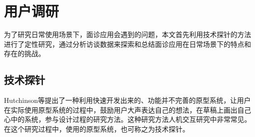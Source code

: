 \chapter{用户调研}

为了研究日常使用场景下，面诊应用会遇到的问题，本文首先利用技术探针\cite{Hutchinson2003Technology}的方法进行了定性研究，通过分析访谈数据来探索和总结面诊应用在日常场景下的特点和存在的挑战。


\section{技术探针}

Hutchinson等\cite{Hutchinson2003Technology}提出了一种利用快速开发出来的、功能并不完善的原型系统，让用户在实际使用原型系统的过程中，鼓励用户大声表达自己的想法，在草稿上画出自己心中的系统，参与设计过程的研究方法。这种研究方法人机交互研究中非常常见。在这个研究过程中，使用的原型系统，也可称之为技术探针。

